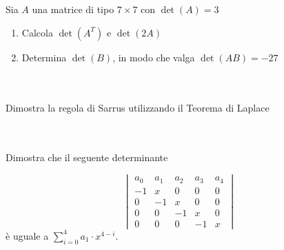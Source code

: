 \documentclass[a4paper,10pt]{article}
\begin{document}


\bigskip



 \\\\
    Sia $A$ una matrice di tipo $7 \times 7$ con $\det(A)=3$
    \begin{enumerate}
        \item Calcola $\det(A^{T})$ e $\det(2A)$
        \item Determina $\det(B)$, in modo che valga $\det(AB) = -27$
    \end{enumerate}



\bigskip



 \\\\
    Dimostra la regola di Sarrus utilizzando il Teorema di Laplace



\pagebreak


 \\\\
    Dimostra che il seguente determinante

        $$ 
        \begin{vmatrix}
            a_{0} & a_{1} & a_{2} & a_{3} & a_{4} \\
            -1 & x & 0 & 0 & 0 \\
            0 & -1 & x & 0 & 0 \\
            0 & 0 & -1 & x & 0 \\
            0 & 0 & 0 & -1 & x 
        \end{vmatrix}
        $$
    è uguale a $\displaystyle\sum\limits_{i=0}^{4}{a_{1} \cdot x^{4-i}}$.

\end{document}
